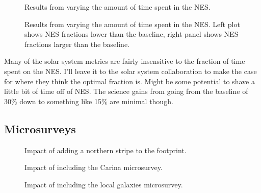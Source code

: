 \begin{figure}
\caption{Results from varying the amount of time spent in the NES. \label{fig:vary_nes}}
\end{figure}

\begin{figure}
\caption{Results from varying the amount of time spent in the NES. Left plot shows NES fractions lower than the baseline, right panel shows NES fractions larger than the baseline.\label{fig:vary_nes_mags}}
\end{figure}


Many of the solar system metrics are fairly insensitive to the fraction of time spent on the NES. I'll leave it to the solar system collaboration to make the case for where they think the optimal fraction is. Might be some potential to shave a little bit of time off of NES. The science gains from going from the baseline of 30\% down to something like 15\% are minimal though.


\subsection{Microsurveys}

\begin{figure}
\caption{Impact of adding a northern stripe to the footprint. \label{fig:north_stripe} }
\end{figure}



\begin{figure}
\caption{Impact of including the Carina microsurvey.  \label{fig:carina}}
\end{figure}


\begin{figure}
\caption{Impact of including the local galaxies microsurvey. \label{fig:local_gals}}
\end{figure}

